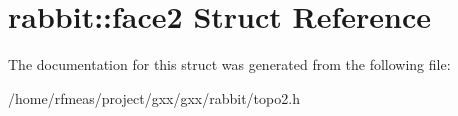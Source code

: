 \hypertarget{structrabbit_1_1face2}{}\section{rabbit\+:\+:face2 Struct Reference}
\label{structrabbit_1_1face2}


The documentation for this struct was generated from the following file\+:\begin{DoxyCompactItemize}
\item 
/home/rfmeas/project/gxx/gxx/rabbit/topo2.\+h\end{DoxyCompactItemize}
